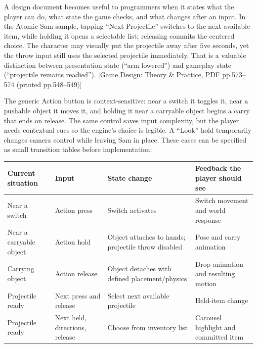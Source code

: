 \hypertarget{05-engine-i-ch009-design-a-mechanic-as-a-state-transition-not-just-a-button-label}{}

A design document becomes useful to programmers when it states what the player can do, what state the game checks, and what changes after an input. In the Atomic Sam sample, tapping ``Next Projectile'' switches to the next available item, while holding it opens a selectable list; releasing commits the centered choice. The character may visually put the projectile away after five seconds, yet the throw input still uses the selected projectile immediately. That is a valuable distinction between presentation state (``arm lowered'') and gameplay state (``projectile remains readied''). {[}Game Design: Theory \& Practice, PDF pp.573--574 (printed pp.548--549){]}

The generic Action button is context-sensitive: near a switch it toggles it, near a pushable object it moves it, and holding it near a carryable object begins a carry that ends on release. The same control saves input complexity, but the player needs contextual cues so the engine's choice is legible. A ``Look'' hold temporarily changes camera control while leaving Sam in place. These cases can be specified as small transition tables before implementation:

{\def\LTcaptype{none} %
\begin{longtable}[]{@{}
  >{\raggedright\arraybackslash}p{}
  >{\raggedright\arraybackslash}p{}
  >{\raggedright\arraybackslash}p{}
  >{\raggedright\arraybackslash}p{}@{}}
\toprule\noalign{}
\begin{minipage}[b]{\linewidth}\raggedright
Current situation
\end{minipage} & \begin{minipage}[b]{\linewidth}\raggedright
Input
\end{minipage} & \begin{minipage}[b]{\linewidth}\raggedright
State change
\end{minipage} & \begin{minipage}[b]{\linewidth}\raggedright
Feedback the player should see
\end{minipage} \\
\midrule\noalign{}
\endhead
\bottomrule\noalign{}
\endlastfoot
Near a switch & Action press & Switch activates & Switch movement and world response \\
Near a carryable object & Action hold & Object attaches to hands; projectile throw disabled & Pose and carry animation \\
Carrying object & Action release & Object detaches with defined placement/physics & Drop animation and resulting motion \\
Projectile ready & Next press and release & Select next available projectile & Held-item change \\
Projectile ready & Next held, directions, release & Choose from inventory list & Carousel highlight and committed item \\
\end{longtable}
}

